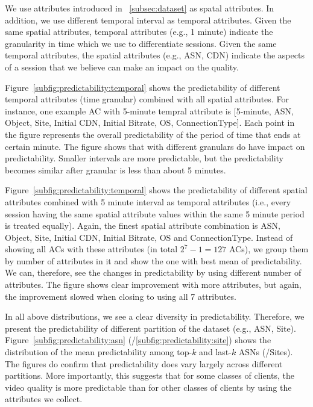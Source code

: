 We use attributes introduced in \Section~\ref{subsec:dataset} as spatal attributes. In addition, we use different temporal interval as temporal attributes.
Given the same spatial attributes, temporal attributes (e.g., 1 minute) indicate the granularity in time which we use to differentiate sessions. Given the same temporal attributes, the spatial attributes (e.g., ASN, CDN) indicate the aspects of a session that we believe can make an impact on the quality.

 Figure~\ref{subfig:predictability:temporal} shows the predictability of different temporal attributes (time granular) combined with all spatial attributes. For instance, one example AC with 5-minute tempral attribute is [5-minute, ASN, Object, Site, Initial CDN, Initial Bitrate, OS, ConnectionType]. Each point in the figure represents the overall predictability of the period of time that ends at certain minute. The figure shows that with different granulars do have impact on predictability. Smaller intervals are more predictable, but the predictability becomes similar after granular is less than about 5 minutes.

 Figure~\ref{subfig:predictability:temporal} shows the predictability of different spatial attributes combined with 5 minute interval as temporal attributes (i.e., every session having the same spatial attribute values within the same 5 minute period is treated equally). Again, the finest spatial attribute combination is ASN, Object, Site, Initial CDN, Initial Bitrate, OS and ConnectionType.  Instead of showing all ACs with these attributes (in total $2^7-1=127$ ACs), we group them by number of attributes in it and show the one with best mean of predictability. We can, therefore, see the changes in predictability by using different number of attributes. The figure shows clear improvement with more attributes, but again, the improvement slowed when closing to using all 7 attributes.

 In all above distributions, we see a clear diversity in predictability. Therefore, we present the predictability of different partition of the dataset (e.g., ASN, Site). Figure~\ref{subfig:predictability:asn} (/\ref{subfig:predictability:site}) shows the distribution of the mean predictability among top-$k$ and last-$k$ ASNs (/Sites). The figures do confirm that predictability does vary largely across different partitions. More importantly, this suggests that for some classes of clients, the video quality is more predictable than for other classes of clients by using the attributes we collect.


